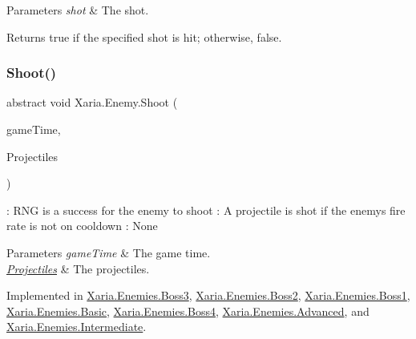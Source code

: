 \begin{DoxyParams}{Parameters}
{\em shot} & The shot.\\
\hline
\end{DoxyParams}
\begin{DoxyReturn}{Returns}
{\ttfamily true} if the specified shot is hit; otherwise, {\ttfamily false}. 
\end{DoxyReturn}
\mbox{\label{classXaria_1_1Enemy_a229b595e96e1429a9e9b1d9816d4370b}} 
\subsubsection{\texorpdfstring{Shoot()}{Shoot()}}
{\footnotesize\ttfamily abstract void Xaria.\+Enemy.\+Shoot (\begin{DoxyParamCaption}\item[{Game\+Time}]{game\+Time,  }\item[{ref List$<$ \hyperlink{classXaria_1_1Projectile}{Projectile} $>$}]{Projectiles }\end{DoxyParamCaption})\hspace{0.3cm}{\ttfamily [pure virtual]}}



\+: R\+NG is a success for the enemy to shoot \+: A projectile is shot if the enemy\textquotesingle{}s fire rate is not on cooldown \+: None 


\begin{DoxyParams}{Parameters}
{\em game\+Time} & The game time.\\
\hline
{\em \hyperlink{namespaceXaria_1_1Projectiles}{Projectiles}} & The projectiles.\\
\hline
\end{DoxyParams}


Implemented in \hyperlink{classXaria_1_1Enemies_1_1Boss3_a5dfe4d674dc5bf5b39b0625ed89b1eb5}{Xaria.\+Enemies.\+Boss3}, \hyperlink{classXaria_1_1Enemies_1_1Boss2_ab1a3c2b68ec14481a3daba180782cce4}{Xaria.\+Enemies.\+Boss2}, \hyperlink{classXaria_1_1Enemies_1_1Boss1_a10fd351c6577ca1e85ec2396d421c313}{Xaria.\+Enemies.\+Boss1}, \hyperlink{classXaria_1_1Enemies_1_1Basic_a60c5523093585a2d52a9b587acf3bc28}{Xaria.\+Enemies.\+Basic}, \hyperlink{classXaria_1_1Enemies_1_1Boss4_a8f2416704b32c1ceedfa08b7e226924e}{Xaria.\+Enemies.\+Boss4}, \hyperlink{classXaria_1_1Enemies_1_1Advanced_af838890dc217792b449a18a266e5518b}{Xaria.\+Enemies.\+Advanced}, and \hyperlink{classXaria_1_1Enemies_1_1Intermediate_a841e04a489be7bf4a75e002ae8b10dcd}{Xaria.\+Enemies.\+Intermediate}.

